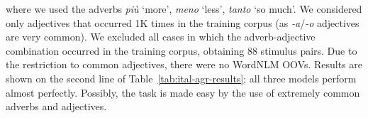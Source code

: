 where we used the adverbs \emph{pi{\`u}} `more', \emph{meno} `less',
\emph{tanto} `so much'. We considered only adjectives that occurred 1K
times in the training corpus (as \emph{-a}/\emph{-o} adjectives are
very common). We excluded all cases in which the
adverb-adjective combination occurred in the training corpus, obtaining 88 stimulus pairs. Due to the restriction to common adjectives, there were no WordNLM OOVs. %
%
Results are shown on the second line of
Table~\ref{tab:ital-agr-results}; all three models perform almost
perfectly.  Possibly, the task is made easy by the use of extremely common
adverbs and adjectives.

